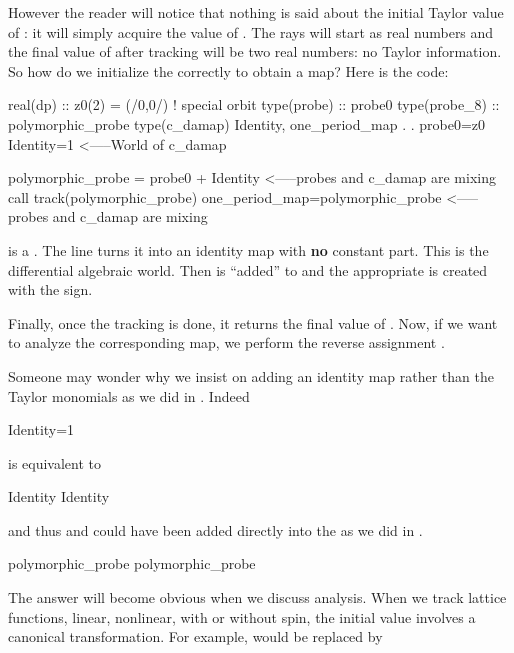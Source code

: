 \documentclass[english,12pt,article]{article} %
\begin{document}
{  However the reader will notice that nothing is said about the initial Taylor value of  : it will simply acquire the value of . The rays will start as real numbers and the final value of    after tracking will be two real numbers: no Taylor information. So how do we initialize the  correctly to obtain a map? Here is the code:
  
      \begin{code}
real(dp) :: z0(2) = (/0,0/)  ! special orbit
type(probe) :: probe0 
type(probe_8) :: polymorphic_probe  
type(c_damap) Identity, one_period_map
             .
             .
 probe0=z0
 Identity=1     <-----World of c_damap

 polymorphic_probe = probe0 + Identity   <-----probes and c_damap are mixing
 call track(polymorphic_probe)
 one_period_map=polymorphic_probe       <-----probes and c_damap are mixing
     \end{code}
  
 is a . The line  turns it into an identity map with {\bf no} constant part. This is the differential algebraic world. 
Then   is ``added'' to  and the appropriate   is  created with the \vn{=} sign. 
  
  Finally, once the tracking is done, it returns the final value of . Now, if we want to analyze the corresponding map, we perform the reverse assignment 
  .  
  
  Someone may wonder why we insist on adding an identity map rather than the Taylor monomials as we did in   . Indeed 
   \begin{example}
   Identity=1
    \end{example}
    is equivalent to 
      \begin{example}
       Identity%
       Identity%
    \end{example}   
    and thus    and  could have been added directly into the  as we did in   .
          \begin{example}
       polymorphic_probe%
       polymorphic_probe%
    \end{example}


The answer will become  obvious when we discuss analysis. When we track lattice functions, linear, nonlinear, with or without spin, the initial value involves a canonical transformation. For example,  would be replaced by 
\vn{normal%



}}
\end{document}
